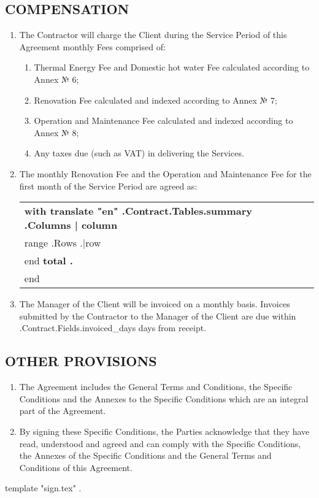 \subsection{COMPENSATION}
\begin{enumerate}
	\item	The Contractor will charge the Client during the Service Period of this Agreement monthly Fees comprised of:
	\begin{enumerate}
		\item	Thermal Energy Fee and Domestic hot water Fee calculated according to Annex № 6;
		\item	Renovation Fee calculated and indexed according to Annex № 7;
		\item	Operation and Maintenance Fee calculated and indexed according to Annex № 8;
		\item	Any taxes due (such as VAT) in delivering the Services.

	\end{enumerate}
	\item	The monthly Renovation Fee and the Operation and Maintenance Fee for the first month of the Service Period are agreed as:
\begin{center}
	\begin{tabu}{|X|X|X|X|}\tabucline{}\rowfont[c]\bfseries
	{{with translate "en" .Contract.Tables.summary}} %
	{{.Columns | column}} \\\tabucline{}
	{{range .Rows}} %
	{{.|row}} \\\tabucline{}
	{{end}}
	\bfseries {{total .}} \\\tabucline{} %
	{{end}}
	\end{tabu}
\end{center}


	\item	The Manager of the Client will be invoiced on a monthly basis. Invoices submitted by the Contractor to the Manager of the Client are due within \iffalse input fields.invoiced_days value="{{.Contract.Fields.invoiced_days}}" type="number" \fi {{.Contract.Fields.invoiced_days}} days from receipt.
\end{enumerate}

\subsection{OTHER PROVISIONS}
\begin{enumerate}
	\item	The Agreement includes the General Terms and Conditions, the Specific Conditions and the Annexes to the Specific Conditions which are an integral part of the Agreement.
	\item	By signing these Specific Conditions, the Parties acknowledge that they have read, understood and agreed and can comply with the Specific Conditions, the Annexes of the Specific Conditions and the General Terms and Conditions of this Agreement.
\end{enumerate}
{{template "sign.tex" .}} %

